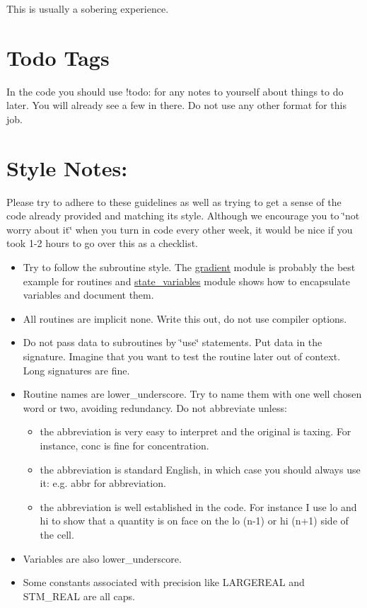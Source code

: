 This is usually a sobering experience.\hypertarget{index_todo}{}\section{Todo Tags}\label{index_todo}
In the code you should use !todo: for any notes to yourself about things to do later. You will already see a few in there. Do not use any other format for this job.\hypertarget{index_style}{}\section{Style Notes:}\label{index_style}
Please try to adhere to these guidelines as well as trying to get a sense of the code already provided and matching its style. Although we encourage you to \char`\"{}not worry about it\char`\"{} when you turn in code every other week, it would be nice if you took 1-2 hours to go over this as a checklist.\begin{itemize}
\item Try to follow the subroutine style. The \hyperlink{a00061}{gradient} module is probably the best example for routines and \hyperlink{a00070}{state\_\-variables} module shows how to encapsulate variables and document them.\item All routines are implicit none. Write this out, do not use compiler options.\item Do not pass data to subroutines by \char`\"{}use\char`\"{} statements. Put data in the signature. Imagine that you want to test the routine later out of context. Long signatures are fine.\item Routine names are lower\_\-underscore. Try to name them with one well chosen word or two, avoiding redundancy. Do not abbreviate unless:\begin{itemize}
\item the abbreviation is very easy to interpret and the original is taxing. For instance, conc is fine for concentration.\item the abbreviation is standard English, in which case you should always use it: e.g. abbr for abbreviation.\item the abbreviation is well established in the code. For instance I use lo and hi to show that a quantity is on face on the lo (n-1) or hi (n+1) side of the cell.\end{itemize}
\item Variables are also lower\_\-underscore.\item Some constants associated with precision like LARGEREAL and STM\_\-REAL are all caps.\begin{itemize}

\end{itemize}
\end{itemize}

